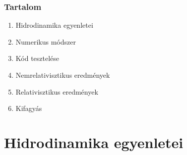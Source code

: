 \documentclass{beamer}
\begin{document}
\begin{frame}
\frametitle{Tartalom}
\begin{enumerate}
  \setlength{\itemsep}{16pt}
\item<1-> Hidrodinamika egyenletei
\item<1-> Numerikus módszer
\item<1-> Kód tesztelése
\item<2-> Nemrelativisztikus eredmények
\item<2-> Relativisztikus eredmények
\item<2-> Kifagyás
\end{enumerate}

\end{frame}

\section{Hidrodinamika egyenletei}
\end{document}
